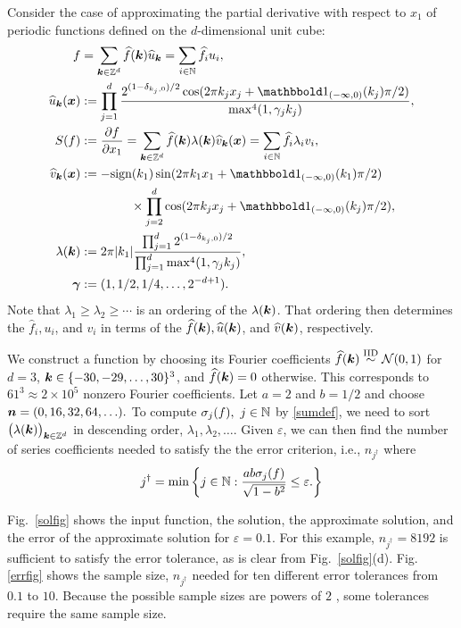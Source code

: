 \documentclass[graybox,footinfo]{svmult}
\newcommand{\DHJRabs}[1]{\ensuremath{{\left \lvert #1 \right \rvert}}}
\begin{document}
Consider the case of approximating the  partial derivative with respect to $x_1$ of periodic functions defined on the $d$-dimensional unit cube:
\begin{align*}
\allowdisplaybreaks
f &= \sum_{\bsk \in \bbZ^d} \widehat{f}(\bsk) \widehat{u}_{\bsk} = \sum_{i \in \bbN} \widehat{f}_i u_i , \\
\widehat{u}_{\bsk} (\bsx) &:= \prod_{j=1}^d \frac{2^{(1-\delta_{k_j,0})/2}\cos(2\pi k_j x_j  + \bbone_{(-\infty,0)}(k_j) \pi/2 )}{\max^4(1,\gamma_j k_j)},  \\ 
S(f) &: = \frac{\partial f}{\partial x_1} = \sum_{\bsk \in \bbZ^d} \widehat{f}(\bsk) \lambda(\bsk) \widehat{v}_{\bsk} (\bsx)
= \sum_{i \in \bbN} \widehat{f}_i \lambda_i v_i, \\ 
\widehat{v}_{\bsk}(\bsx) & : =  -\textup{sign}(k_1)  \sin(2\pi k_1 x_1  + \bbone_{(-\infty,0)}(k_1) \pi/2 ) \\
& \qquad \qquad \times \prod_{j=2}^d
\cos(2\pi k_j x_j  + \bbone_{(-\infty,0)}(k_j) \pi/2 ), \\ 
\lambda(\bsk) &:= 2 \pi \DHJRabs{k_1}\frac{\prod_{j=1}^d 2^{(1-\delta_{k_j,0})/2}}{\prod_{j=1}^d\max^4(1,\gamma_j k_j)}, \\
\boldsymbol{\gamma} & := (1,1/2, 1/4, \ldots, 2^{-d+1}).
\end{align*}
Note that $\lambda_1 \ge \lambda_2 \ge \cdots$ is an ordering of the $\lambda({\boldsymbol{k}})$.  That ordering then determines the $\widehat{f}_i, u_i$, and $v_i$ in terms of the $\widehat{f}({\boldsymbol{k}}), \widehat{u}({\boldsymbol{k}})$, and $\widehat{v}({\boldsymbol{k}})$, respectively.

We construct a function by choosing its Fourier coefficients $\widehat{f}({\boldsymbol{k}}) \overset{\text{IID}}{\sim}  \mathcal{N}(0,1)$ for $d=3$, ${\boldsymbol{k}} \in \{-30, -29, \ldots, 30\}^3$, and $\widehat{f}({\boldsymbol{k}}) = 0$ otherwise.  This corresponds to $61^3 \approx 2 \times 10^5$ nonzero Fourier coefficients.  Let $ a= 2$ and  $b=1/2$ and 
 choose ${\boldsymbol{n}} = (0, 16, 32, 64, \ldots ).$
 To  compute $\sigma_j(f), \ j \in {\mathbb{N}}$ by \eqref{sumdef},
 we need to sort $\bigl(\lambda({\boldsymbol{k}})\bigr)_{{\boldsymbol{k}} \in {\mathbb{Z}}^d}$ in descending order, $\lambda_1, \lambda_2, \ldots$. Given $\varepsilon$, we can then find the number of series coefficients needed to satisfy the the error criterion, i.e., $n_{j^\dagger}$ where
 \[j^{\dagger} = \min \left\{j \in {\mathbb{N}} : \frac{ab\sigma_j(f)}{\sqrt{1-b^2}}  \le \varepsilon. \right\}\]
 
Fig.\ \ref{solfig} shows the input function, the solution, the approximate solution, and the error of the approximate solution for $\varepsilon = 0.1$.  For this example, $ n_{j^\dagger} = 8192$ is sufficient to satisfy the error tolerance, as is clear from Fig.\ \ref{solfig}(d).  Fig. \ref{errfig} shows the sample size, $n_{j^\dagger}$ needed for ten different error tolerances from $0.1$ to $10$. Because the possible sample sizes are powers of $2$ , some tolerances require the same sample size.
\end{document}
